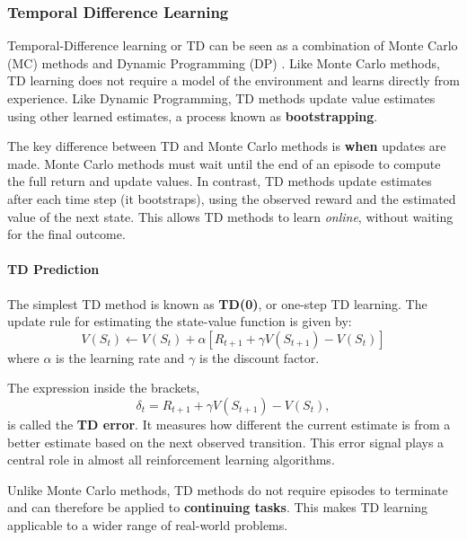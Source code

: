 \subsubsection{Temporal Difference Learning}

Temporal-Difference learning or TD can be seen as a combination of Monte Carlo (MC) methods and Dynamic Programming (DP) \cite{sutton}. Like Monte Carlo methods, TD learning does not require a model of the environment and learns directly from experience. Like Dynamic Programming, TD methods update value estimates using other learned estimates, a process known as \textbf{bootstrapping}.

The key difference between TD and Monte Carlo methods is \textbf{when} updates are made. Monte Carlo methods must wait until the end of an episode to compute the full return and update values. In contrast, TD methods update estimates after each time step (it bootstraps), using the observed reward and the estimated value of the next state. This allows TD methods to learn \emph{online}, without waiting for the final outcome.




\paragraph{TD Prediction}

The simplest TD method is known as \textbf{TD(0)}, or one-step TD learning. The update rule for estimating the state-value function is given by:
\[
V(S_t) \leftarrow V(S_t) + \alpha \left[ R_{t+1} + \gamma V(S_{t+1}) - V(S_t) \right]
\]
where $\alpha$ is the learning rate and $\gamma$ is the discount factor.





The expression inside the brackets,
\[
\delta_t = R_{t+1} + \gamma V(S_{t+1}) - V(S_t),
\]
is called the \textbf{TD error}. It measures how different the current estimate is from a better estimate based on the next observed transition. This error signal plays a central role in almost all reinforcement learning algorithms.



Unlike Monte Carlo methods, TD methods do not require episodes to terminate and can therefore be applied to \textbf{continuing tasks}. This makes TD learning applicable to a wider range of real-world problems.






